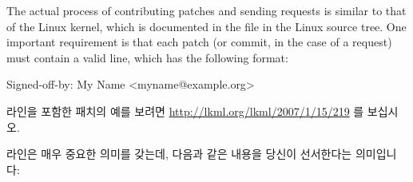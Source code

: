 The actual process of contributing patches and sending 
requests is similar to that of the Linux kernel, which is documented
in the  file in the Linux source tree.
One important requirement is that each patch (or commit, in the case
of a  request) must contain a valid  line,
which has the following format:
\fi

\begin{VerbatimU}
Signed-off-by: My Name <myname@example.org>
\end{VerbatimU}

 라인을 포함한 패치의 예를 보려면
\url{http://lkml.org/lkml/2007/1/15/219} 를 보십시오.
\iffalse

Please see \url{http://lkml.org/lkml/2007/1/15/219} for an example
patch containing a \co{Signed-off-by:} line.
\fi

 라인은 매우 중요한 의미를 갖는데, 다음과 같은 내용을 당신이
선서한다는 의미입니다:
\iffalse

It is important to note that the \co{Signed-off-by:} line has
a very specific meaning, namely that you are certifying that:
\fi

